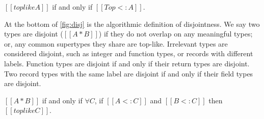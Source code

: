 \begin{theorem}
  $[[toplike A]]$ if and only if $[[Top<:A]]$.
\end{theorem}

At the bottom of \autoref{fig:disj} is the algorithmic definition of
disjointness. We say two types are disjoint ($[[A*B]]$) if they do not overlap
on any meaningful types; or, any common supertypes they share are top-like.
Irrelevant types are considered disjoint, such as integer and function types, or
records with different labels. Function types are disjoint if and only if their
return types are disjoint. Two record types with the same label are disjoint if
and only if their field types are disjoint.

\begin{theorem}\label{thm:disjoint}
  $[[A*B]]$ if and only if
  $\forall C$, if $[[A<:C]]$ and $[[B<:C]]$ then $[[toplike C]]$.
\end{theorem}

